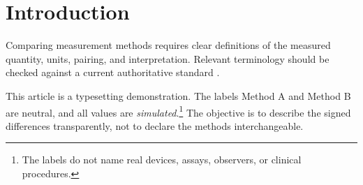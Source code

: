 \section{Introduction}
\label{sec:introduction}

Comparing measurement methods requires clear definitions of the measured
quantity, units, pairing, and interpretation. Relevant terminology should be
checked against a current authoritative standard \parencite{iso5725}.

This article is a typesetting demonstration. The labels Method A and Method B
are neutral, and all values are \emph{simulated}.\footnote{The labels do not
name real devices, assays, observers, or clinical procedures.} The objective is
to describe the signed differences transparently, not to declare the methods
interchangeable.
